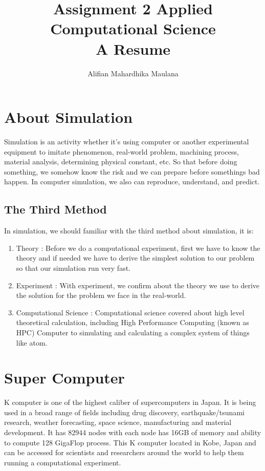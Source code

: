 \documentclass[a4paper,11pt]{article}
\title{Assignment 2 Applied Computational Science\\A Resume}
\author{Alifian Mahardhika Maulana}
\begin{document}
\maketitle
\section{About Simulation}
Simulation is an activity whether it's using computer or another experimental equipment to imitate phenomenon, real-world problem, machining process, material analysis, determining physical constant, etc. So that before doing something, we somehow know the risk and we can prepare before somethings bad happen. In computer simulation, we also can reproduce, understand, and predict.
\subsection{The Third Method}
In simulation, we should familiar with the third method about simulation, it is:
\begin{center}
\end{center}
\begin{enumerate}[label=(\alph*)]
	\item Theory : Before we do a computational experiment, first we have to know the theory and if needed we have to derive the simplest solution to our problem so that our simulation run very fast.
	\item Experiment : With experiment, we confirm about the theory we use to derive the solution for the problem we face in the real-world.
	\item Computational Science : Computational science covered about high level theoretical calculation, including High Performance Computing (known as HPC) Computer to simulating and calculating a complex system of things like atom.
\end{enumerate}

\section{Super Computer}
K computer is one of the highest caliber of supercomputers in Japan. It is being used in a broad range of fields including drug discovery, earthquake/tsunami research, weather forecasting, space science, manufacturing and material development. It has 82944 nodes with each node has 16GB of memory and ability to compute 128 GigaFlop process. This K computer located in Kobe, Japan and can be accessed for scientists and researchers around the world to help them running a computational experiment.
\end{document}

